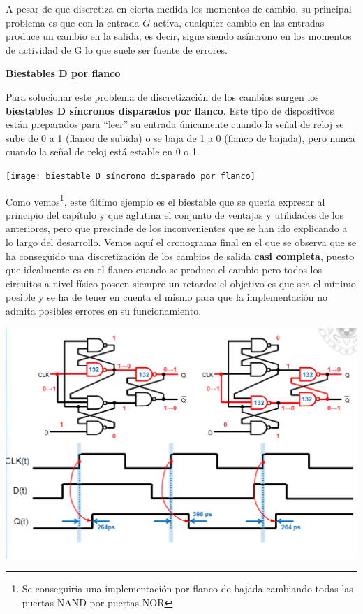 \documentclass[a4paper,10pt]{book}
\begin{document}
A pesar de que discretiza en cierta medida los momentos de cambio, su principal problema es que con la entrada $G$ activa, cualquier cambio en las entradas produce un cambio en la salida, es decir, sigue siendo asíncrono en los momentos de actividad de G lo que suele ser fuente de errores.

\underline{\textbf{Biestables D por flanco}}\par

Para solucionar este problema de discretización de los cambios surgen los \textbf{biestables D síncronos disparados por flanco}. Este tipo de dispositivos están preparados para ``leer'' su entrada únicamente cuando la señal de reloj se sube de 0 a 1 (flanco de subida) o se baja de 1 a 0 (flanco de bajada), pero nunca cuando la señal de reloj está estable en 0 o 1.

\begin{center}
\texttt{[image: biestable D síncrono disparado por flanco]}
\end{center}

Como vemos\footnote{Se conseguiría una implementación por flanco de bajada cambiando todas las puertas NAND por puertas NOR}, este último ejemplo es el biestable que se quería expresar al principio del capítulo y que aglutina el conjunto de ventajas y utilidades de los anteriores, pero que prescinde de los inconvenientes que se han ido explicando a lo largo del desarrollo. Vemos aquí el cronograma final en el que se observa que se ha conseguido una discretización de los cambios de salida \textbf{casi completa}, puesto que idealmente es en el flanco cuando se produce el cambio pero todos los circuitos a nivel físico poseen siempre un retardo: el objetivo es que sea el mínimo posible y se ha de tener en cuenta el mismo para que la implementación no admita posibles errores en su funcionamiento.

\begin{center}
\includegraphics[scale=0.5]{cronograma biestables D sincronos}
\end{center}
\end{document}

